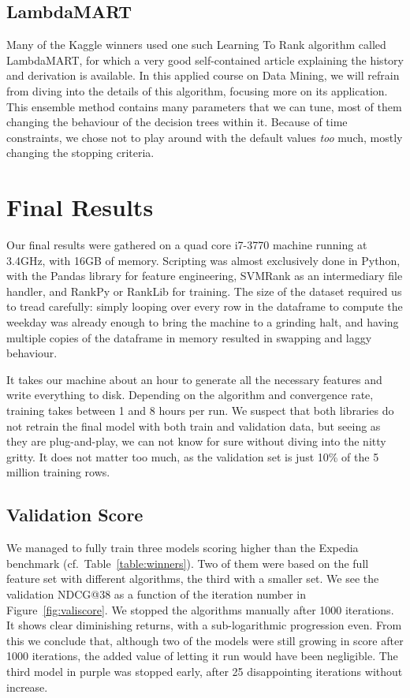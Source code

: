 \documentclass[runningheads,a4paper]{llncs}
\begin{document}
\subsection{LambdaMART}
Many of the Kaggle winners used one such Learning To Rank algorithm called LambdaMART, for which a very good self-contained article explaining the history and derivation is available. \cite{burges2010} In this applied course on Data Mining, we will refrain from diving into the details of this algorithm, focusing more on its application. This ensemble method contains many parameters that we can tune, most of them changing the behaviour of the decision trees within it. Because of time constraints, we chose not to play around with the default values \emph{too} much, mostly changing the stopping criteria.

\section{Final Results}
Our final results were gathered on a quad core i7-3770 machine running at 3.4GHz, with 16GB of memory. Scripting was almost exclusively done in Python, with the Pandas library \cite{pandas} for feature engineering, SVMRank \cite{svmrank} as an intermediary file handler, and RankPy \cite{rankpy} or RankLib \cite{ranklib} for training.  The size of the dataset required us to tread carefully: simply looping over every row in the dataframe to compute the weekday was already enough to bring the machine to a grinding halt, and having multiple copies of the dataframe in memory resulted in swapping and laggy behaviour.

It takes our machine about an hour to generate all the necessary features and write everything to disk. Depending on the algorithm and convergence rate, training takes between 1 and 8 hours per run. We suspect that both libraries do not retrain the final model with both train and validation data, but seeing as they are plug-and-play, we can not know for sure without diving into the nitty gritty. It does not matter too much, as the validation set is just 10\% of the 5 million training rows.

\subsection{Validation Score}
We managed to fully train three models scoring higher than the Expedia benchmark (cf.~Table~\ref{table:winners}). Two of them were based on the full feature set with different algorithms, the third with a smaller set. We see the validation NDCG@38 as a function of the iteration number in Figure~\ref{fig:valiscore}. We stopped the algorithms manually after 1000 iterations. It shows clear diminishing returns, with a sub-logarithmic progression even. From this we conclude that, although two of the models were still growing in score after 1000 iterations, the added value of letting it run would have been negligible. The third model in purple was stopped early, after 25 disappointing iterations without increase.
\end{document}
